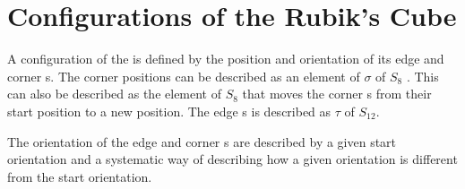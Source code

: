 \section{Configurations of the Rubik's Cube}

A configuration of the \rubik{} is defined by the position and orientation of its edge and corner \cpiece{}s. The corner \cpiece{} positions can be described as an element of $\sigma$ of $S_8$ . This can also be described as the element of $S_8$ that moves the corner \cpiece{}s from their start position to a new position. The edge \cpiece{}s is described as $\tau$ of $S_12$. 

The orientation of the edge and corner \cpiece{}s are described by a given start orientation and a systematic way of describing how a given orientation is different from the start orientation.

\myTail{
}
%